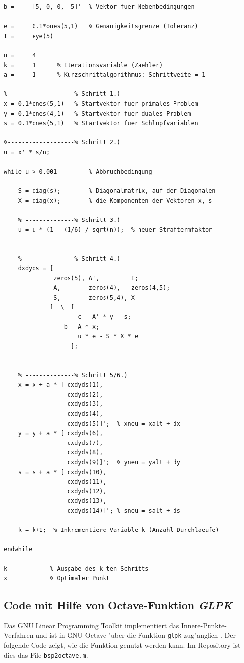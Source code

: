 \begin{refsection}
\begin{lstlisting}[style=Matlab]
b =     [5, 0, 0, -5]'  % Vektor fuer Nebenbedingungen

e =     0.1*ones(5,1)   % Genauigkeitsgrenze (Toleranz)
I =     eye(5)	

n =     4
k =     1      % Iterationsvariable (Zaehler)
a =     1      % Kurzschrittalgorithmus: Schrittweite = 1

%-------------------% Schritt 1.)
x = 0.1*ones(5,1)   % Startvektor fuer primales Problem
y = 0.1*ones(4,1)   % Startvektor fuer duales Problem
s = 0.1*ones(5,1)   % Startvektor fuer Schlupfvariablen

%-------------------% Schritt 2.)
u = x' * s/n;

while u > 0.001         % Abbruchbedingung	

    S = diag(s);        % Diagonalmatrix, auf der Diagonalen
    X = diag(x);        % die Komponenten der Vektoren x, s

    % --------------% Schritt 3.)
    u = u * (1 - (1/6) / sqrt(n));  % neuer Straftermfaktor


    % --------------% Schritt 4.)
    dxdyds = [
              zeros(5), A',         I;
              A,        zeros(4),   zeros(4,5);
              S,        zeros(5,4), X
             ]  \  [
                     c - A' * y - s;
	             b - A * x;
                     u * e - S * X * e
                   ];


    % --------------% Schritt 5/6.)
    x = x + a * [ dxdyds(1),
                  dxdyds(2),
                  dxdyds(3),
                  dxdyds(4),
                  dxdyds(5)]';  % xneu = xalt + dx 
    y = y + a * [ dxdyds(6),
                  dxdyds(7),
                  dxdyds(8),
                  dxdyds(9)]';  % yneu = yalt + dy 
    s = s + a * [ dxdyds(10),
                  dxdyds(11),
                  dxdyds(12),
                  dxdyds(13),
                  dxdyds(14)]'; % sneu = salt + ds 
    
    k = k+1;  % Inkrementiere Variable k (Anzahl Durchlaeufe)

endwhile

k            % Ausgabe des k-ten Schritts
x            % Optimaler Punkt
\end{lstlisting}


\subsection{Code mit Hilfe von Octave-Funktion \textit{GLPK}}
Das GNU Linear Programming Toolkit implementiert das Innere-Punkte-Verfahren
und ist in GNU Octave "uber die Funktion {\tt glpk} zug"anglich
\cite{ip:glpk}.
Der folgende Code zeigt, wie die Funktion genutzt werden kann.
Im Repository ist dies das File {\tt bsp2octave.m}.


\end{refsection}
